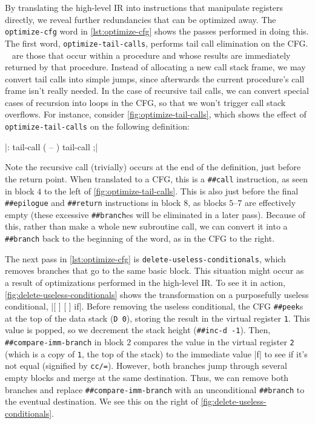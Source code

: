 By translating the high-level \gls{IR} into instructions that manipulate
registers directly, we reveal further redundancies that can be optimized away.
The \Verb|optimize-cfg| word in \cref{lst:optimize-cfg} shows the passes
performed in doing this.  The first word, \Verb|optimize-tail-calls|,
performs tail call elimination on the \gls{CFG}.
%
~ are those
that occur within a procedure and whose results are immediately returned by
that procedure.  Instead of allocating a new call stack frame, we may convert
tail calls into simple jumps, since afterwards the current procedure's call
frame isn't really needed.  In the case of recursive tail calls, we can convert
special cases of recursion into loops in the \gls{CFG}, so that we won't
trigger call stack overflows.  For instance, consider
\cref{fig:optimize-tail-calls}, which shows the effect of
\Verb|optimize-tail-calls| on the following definition:
%
\begin{center}
%
  \factor|: tail-call ( -- ) tail-call ;|
%
\end{center}
%
\noindent Note the recursive call (trivially) occurs at the end of the
definition, just before the return point.  When translated to a \gls{CFG}, this
is a \Verb|##call| instruction, as seen in block $4$ to the left of
\cref{fig:optimize-tail-calls}.  This is also just before the final
\Verb|##epilogue| and \Verb|##return| instructions in block $8$, as blocks
$5$--$7$ are effectively empty (these excessive \Verb|##branch|es will be
eliminated in a later pass).  Because of this, rather than make a whole new
subroutine call, we can convert it into a \Verb|##branch| back to the
beginning of the word, as in the \gls{CFG} to the right.


The next pass in \cref{lst:optimize-cfg} is
\Verb|delete-useless-conditionals|, which removes branches that go to the
same basic block.  This situation might occur as a result of optimizations
performed in the high-level \gls{IR}.  To see it in action,
\cref{fig:delete-useless-conditionals} shows the transformation on a
purposefully useless conditional,
%
\factor|[ ] [ ] if|.
%
Before removing the useless conditional, the \gls{CFG} \Verb|##peek|s at the
top of the data stack
%
(\Verb|D 0|),
%
storing the result in the virtual register \Verb|1|.  This value is popped,
so we decrement the stack height
%
(\Verb|##inc-d -1|).
%
Then, \Verb|##compare-imm-branch| in block $2$ compares the value in the
virtual register \Verb|2| (which is a copy of \Verb|1|, the top of the
stack) to the immediate value \factor|f| to see if it's not equal (signified by
\Verb|cc/=|).  However, both branches jump through several empty blocks and
merge at the same destination.  Thus, we can remove both branches and replace
\Verb|##compare-imm-branch| with an unconditional \Verb|##branch| to the
eventual destination.  We see this on the right of
\cref{fig:delete-useless-conditionals}.

